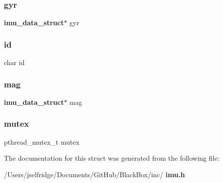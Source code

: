\mbox{\label{structimu__struct_a779ad7c65ad4709d709ce2b15de4a06c}} 
\subsubsection{gyr}
{\footnotesize\ttfamily \textbf{ imu\+\_\+data\+\_\+struct}$\ast$ gyr}

\mbox{\label{structimu__struct_af749ccd9c242573390416d80accd7b39}} 
\subsubsection{id}
{\footnotesize\ttfamily char id}

\mbox{\label{structimu__struct_aca3bd296a358fb01cde31d7d24a77b0a}} 
\subsubsection{mag}
{\footnotesize\ttfamily \textbf{ imu\+\_\+data\+\_\+struct}$\ast$ mag}

\mbox{\label{structimu__struct_a4acff8232e4aec9cd5c6dc200ac55ef3}} 
\subsubsection{mutex}
{\footnotesize\ttfamily pthread\+\_\+mutex\+\_\+t mutex}



The documentation for this struct was generated from the following file\+:\begin{DoxyCompactItemize}
\item 
/\+Users/jselfridge/\+Documents/\+Git\+Hub/\+Black\+Box/inc/\textbf{ imu.\+h}\end{DoxyCompactItemize}
